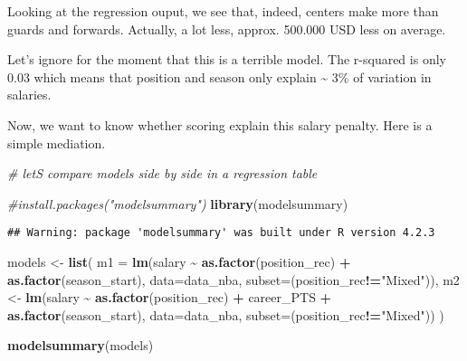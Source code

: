 \documentclass[
]{book}
\newenvironment{Shaded}{\begin{snugshade}}{\end{snugshade}}
\newcommand{\AttributeTok}[1]{\textcolor[rgb]{0.13,0.29,0.53}{#1}}
\newcommand{\CommentTok}[1]{\textcolor[rgb]{0.56,0.35,0.01}{\textit{#1}}}
\newcommand{\FunctionTok}[1]{\textcolor[rgb]{0.13,0.29,0.53}{\textbf{#1}}}
\newcommand{\NormalTok}[1]{#1}
\newcommand{\OtherTok}[1]{\textcolor[rgb]{0.56,0.35,0.01}{#1}}
\newcommand{\SpecialCharTok}[1]{\textcolor[rgb]{0.81,0.36,0.00}{\textbf{#1}}}
\newcommand{\StringTok}[1]{\textcolor[rgb]{0.31,0.60,0.02}{#1}}
\begin{document}
Looking at the regression ouput, we see that, indeed, centers make more than guards and forwards. Actually, a lot less, approx. 500.000 USD less on average.

Let's ignore for the moment that this is a terrible model. The r-squared is only 0.03 which means that position and season only explain \textasciitilde{} 3\% of variation in salaries.

Now, we want to know whether scoring explain this salary penalty. Here is a simple mediation.

\begin{Shaded}
\begin{Highlighting}[]
\CommentTok{\# let\textquotesingle{}S compare models side by side in a regression table}

\CommentTok{\#install.packages("modelsummary")}
\FunctionTok{library}\NormalTok{(modelsummary)}
\end{Highlighting}
\end{Shaded}

\begin{verbatim}
## Warning: package 'modelsummary' was built under R version 4.2.3
\end{verbatim}

\begin{Shaded}
\begin{Highlighting}[]
\NormalTok{models }\OtherTok{\textless{}{-}} \FunctionTok{list}\NormalTok{(}
  \AttributeTok{m1 =} \FunctionTok{lm}\NormalTok{(salary }\SpecialCharTok{\textasciitilde{}} \FunctionTok{as.factor}\NormalTok{(position\_rec) }\SpecialCharTok{+} \FunctionTok{as.factor}\NormalTok{(season\_start), }\AttributeTok{data=}\NormalTok{data\_nba, }\AttributeTok{subset=}\NormalTok{(position\_rec}\SpecialCharTok{!=}\StringTok{"Mixed"}\NormalTok{)),}
\NormalTok{  m2 }\OtherTok{\textless{}{-}} \FunctionTok{lm}\NormalTok{(salary }\SpecialCharTok{\textasciitilde{}} \FunctionTok{as.factor}\NormalTok{(position\_rec) }\SpecialCharTok{+}\NormalTok{ career\_PTS }\SpecialCharTok{+} \FunctionTok{as.factor}\NormalTok{(season\_start), }\AttributeTok{data=}\NormalTok{data\_nba, }\AttributeTok{subset=}\NormalTok{(position\_rec}\SpecialCharTok{!=}\StringTok{"Mixed"}\NormalTok{))}
\NormalTok{)}

\FunctionTok{modelsummary}\NormalTok{(models)}
\end{Highlighting}
\end{Shaded}
\end{document}

